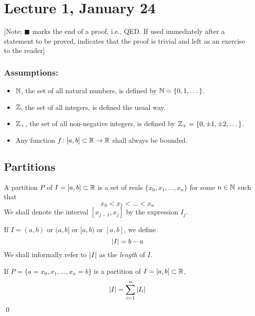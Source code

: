 \chapter*{Lecture 1, January 24}
\setcounter{chapter}{1}
\setcounter{section}{0}

[Note: $\blacksquare$ marks the end of a proof, i.e., QED. If used immediately after a statement to be proved, indicates that the proof is trivial and left as an exercise to the reader]

\subsection*{Assumptions:}

\begin{itemize}
\item
  $\mathbb{N}$, the set of all natural numbers, is defined by $\mathbb{N} = \{0, 1, \dots \}$.

\item
  $\mathbb{Z}$, the set of all integers, is defined the usual way.
  
\item
  $\mathbb{Z}_+$, the set of all non-negative integers, is defined by $\mathbb{Z}_+ = \{0, \pm 1, \pm 2, \dots \}$.

\item
  Any function $f \colon [a, b] \subset \mathbb{R} \to \mathbb{R}$ shall always be bounded.

\end{itemize}

\section{Partitions}

\begin{defn}
  A partition $P$ of $I = [a, b] \subset \mathbb{R}$ is a set of reals $\{x_0, x_1, \dots ,x_n \}$ for some $n \in \mathbb{N}$ such that
  \[
    x_0 < x_1 < \dots < x_n
  \]
  We shall denote the interval $[x_{j-1}, x_j]$ by the expression $I_j$.
\end{defn}

\begin{defn}
  If $I = (a, b)$ or $(a, b]$ or $[a, b)$ or $[a, b]$, we define
  \[
    \abs{I} = b - a
  \]
  We shall informally refer to $\abs{I}$ as the \textit{length} of $I$.
\end{defn}

\begin{claim}
  If $P = \{a = x_0, x_1, \dots ,x_n = b \}$ is a partition of $I = [a, b] \subset \mathbb{R}$,
  \[
    \abs{I} = \sum_{i=1}^n \abs{I_i}
  \]
  \hfill\qed
\end{claim}

